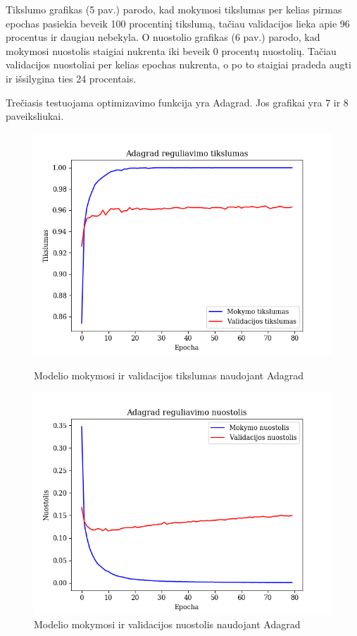 \documentclass{VUMIFPSkursinis}
\begin{document}
Tikslumo grafikas (5 pav.) parodo, kad mokymosi tikslumas per kelias pirmas epochas pasiekia beveik 100 procentinį tikslumą, tačiau validacijos lieka apie 96 procentus ir daugiau nebekyla.
O nuostolio grafikas (6 pav.) parodo, kad mokymosi nuostolis staigiai nukrenta iki beveik 0 procentų nuostolių. Tačiau validacijos nuostoliai per kelias epochas nukrenta, o po to staigiai pradeda augti ir išsilygina ties 24 procentais.

Trečiasis testuojama optimizavimo funkcija yra Adagrad. Jos grafikai yra 7 ir 8 paveiksliukai.

\begin{figure}[!htbp]
  \centering
  \begin{minipage}[b]{0.49\textwidth}
    \includegraphics[width=\textwidth]{img/FT/Adagrad_loss.png}
    \caption{Modelio mokymosi ir validacijos tikslumas naudojant Adagrad}
  \end{minipage}
  \begin{minipage}[b]{0.49\textwidth}
    \includegraphics[width=\textwidth]{img/FT/Adagrad_acc.png}
    \caption{Modelio mokymosi ir validacijos nuostolis naudojant Adagrad}
  \end{minipage}
\end{figure}
\end{document}
